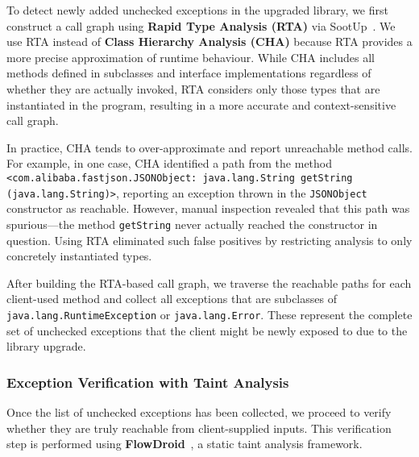 To detect newly added unchecked exceptions in the upgraded library, we first construct a call graph using \textbf{Rapid Type Analysis (RTA)} via SootUp~\cite{Karakaya24:_sootup}. We use RTA instead of \textbf{Class Hierarchy Analysis (CHA)} because RTA provides a more precise approximation of runtime behaviour. While CHA includes all methods defined in subclasses and interface implementations regardless of whether they are actually invoked, RTA considers only those types that are instantiated in the program, resulting in a more accurate and context-sensitive call graph.

In practice, CHA tends to over-approximate and report unreachable method calls. For example, in one case, CHA identified a path from the method \texttt{<com.alibaba.fastjson.JSONObject: java.lang.String getString (java.lang.String)>}, reporting an exception thrown in the \texttt{JSONObject} constructor as reachable. However, manual inspection revealed that this path was spurious—the method \texttt{getString} never actually reached the constructor in question. Using RTA eliminated such false positives by restricting analysis to only concretely instantiated types.

After building the RTA-based call graph, we traverse the reachable paths for each client-used method and collect all exceptions that are subclasses of \texttt{java.lang.RuntimeException} or \texttt{java.lang.Error}. These represent the complete set of unchecked exceptions that the client might be newly exposed to due to the library upgrade.

\subsubsection{Exception Verification with Taint Analysis}

Once the list of unchecked exceptions has been collected, we proceed to verify whether they are truly reachable from client-supplied inputs. This verification step is performed using \textbf{FlowDroid}~\cite{Arzt14:_flowdroid}, a static taint analysis framework. 

